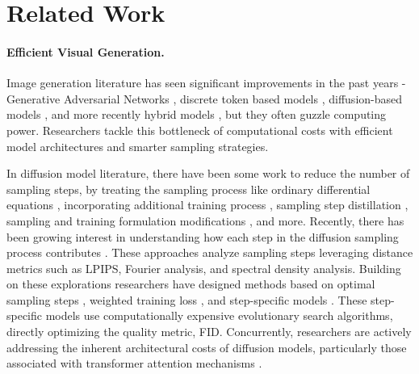 \section{Related Work}
\paragraph{Efficient Visual Generation.}
Image generation literature has seen significant improvements in the past years - Generative Adversarial Networks \citep{brock2018large,sauer2022styleganxlscalingstyleganlarge}, discrete token based models \citep{chang2022maskgit, yu2023magvit}, diffusion-based models \citep{kingma2023understanding, hoogeboom2023simple}, and more recently hybrid models \citep{peebles2023scalablediffusionmodelstransformers, yu2024representationalignmentgenerationtraining}, but they often guzzle computing power. Researchers tackle this bottleneck of computational costs with efficient model architectures and smarter sampling strategies. 


In  diffusion model literature, there have been some work to reduce the number of sampling steps, by treating the sampling process like ordinary differential equations \cite{song2022denoisingdiffusionimplicitmodels, lu2022dpmsolverfastodesolver, liu2022pseudonumericalmethodsdiffusion}, incorporating additional training process \cite{kong2021fastsamplingdiffusionprobabilistic, nichol2021improveddenoisingdiffusionprobabilistic, salimans2022progressivedistillationfastsampling, song2023consistencymodels}, sampling step distillation \cite{salimans2022progressivedistillationfastsampling, song2023consistencymodels,berthelot2023tractdenoisingdiffusionmodels,meng2023distillationguideddiffusionmodels, feng2024relationaldiffusiondistillationefficient}, sampling and training formulation modifications \cite{esser2024scalingrectifiedflowtransformers,song2023consistencymodels}, and more. 
Recently, there has been growing interest in understanding how each step in the diffusion sampling process contributes \cite{ choi2022perceptionprioritizedtrainingdiffusion, park2023understandinglatentspacediffusion, betasampling}. %
These approaches analyze sampling steps leveraging distance metrics such as LPIPS, Fourier analysis, and spectral density analysis.
Building on these explorations researchers have designed methods based on optimal sampling steps \cite{watson2022learningfastsamplersdiffusion,betasampling}, weighted training loss \cite{choi2022perceptionprioritizedtrainingdiffusion}, and step-specific models \cite{li2023autodiffusiontrainingfreeoptimizationtime, yang2024denoisingdiffusionstepawaremodels, lee2023multiarchitecturemultiexpertdiffusionmodels}. These step-specific models use computationally expensive evolutionary search algorithms, directly optimizing the quality metric, FID. Concurrently, researchers are actively addressing the inherent architectural costs of diffusion models, particularly those associated with transformer attention mechanisms \cite{yuan2024ditfastattn,yan2024diffusion}.
 
